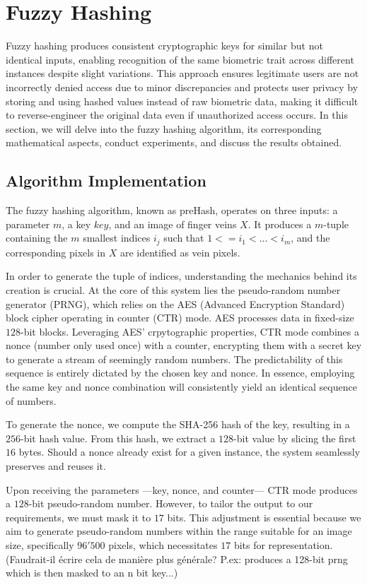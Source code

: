 \section{Fuzzy Hashing}
\label{sec:Fuzzy Hashing}
Fuzzy hashing produces consistent cryptographic keys for similar but not identical inputs, enabling recognition of the same biometric trait across different instances despite slight variations. This approach ensures legitimate users are not incorrectly denied access due to minor discrepancies and protects user privacy by storing and using hashed values instead of raw biometric data, making it difficult to reverse-engineer the original data even if unauthorized access occurs. 
In this section, we will delve into the fuzzy hashing algorithm, its corresponding mathematical aspects, conduct experiments, and discuss the results obtained.
\subsection{Algorithm Implementation}

The fuzzy hashing algorithm, known as preHash, operates on three inputs: a parameter \(m\), a key \(key\), and an image of finger veins \(X\). It produces a \(m\)-tuple containing the \(m\) smallest indices \(i_j\) such that \(1 <= i_1 < ... < i_m\), and the corresponding pixels in \(X\) are identified as vein pixels.

In order to generate the tuple of indices, understanding the mechanics behind its creation is crucial. At the core of this system lies the pseudo-random number generator (PRNG), which relies on the AES (Advanced Encryption Standard) block cipher operating in counter (CTR) mode. AES processes data in fixed-size \(128\)-bit blocks. Leveraging AES' crpytographic properties, CTR mode combines a nonce (number only used once) with a counter, encrypting them with a secret key to generate a stream of seemingly random numbers. 
The predictability of this sequence is entirely dictated by the chosen key and nonce. In essence, employing the same key and nonce combination will consistently yield an identical sequence of numbers. 

To generate the nonce, we compute the SHA-256 hash of the key, resulting in a \(256\)-bit hash value. From this hash, we extract a \(128\)-bit value by slicing the first \(16\) bytes. Should a nonce already exist for a given instance, the system seamlessly preserves and reuses it. 

Upon receiving the parameters —key, nonce, and counter— CTR mode produces a \(128\)-bit pseudo-random number. However, to tailor the output to our requirements, we must mask it to \(17\) bits. This adjustment is essential because we aim to generate pseudo-random numbers within the range suitable for an image size, specifically \(96'500\) pixels, which necessitates \(17\) bits for representation. (Faudrait-il écrire cela de manière plus générale? P.ex: produces a 128-bit prng which is then masked to an n bit key...)

